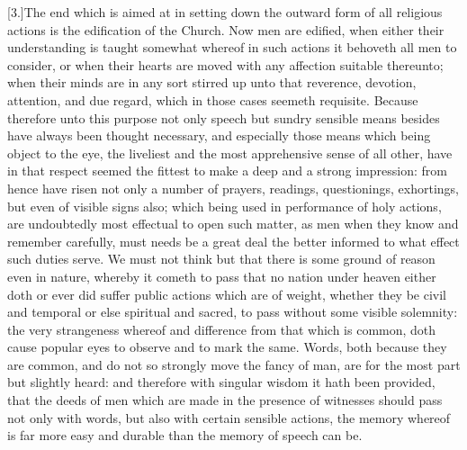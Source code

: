 [3.]The end which is aimed at in setting down the outward form of all religious actions is the edification of the Church. Now men are edified, when either their understanding is taught somewhat whereof in such actions it behoveth all men to consider, or when their hearts are moved with any affection suitable thereunto; when their minds are in any sort stirred up unto that reverence, devotion, attention, and due regard, which in those cases seemeth requisite. Because therefore unto this purpose not only speech but sundry sensible means besides have always been thought necessary, and especially those means which being object to the eye, the liveliest and the most apprehensive sense of all other, have in that respect seemed the fittest to make a deep and a strong impression: from hence have risen not only a number of prayers, readings, questionings, exhortings, but even of visible signs also; which being used in performance of holy actions, are undoubtedly most effectual to open such matter, as men when they know and remember carefully, must needs be a great deal the better informed to what effect such duties serve. We must not think but that there is some ground of reason even in nature, whereby it cometh to pass that no nation under heaven either doth or ever did suffer public actions  which are of weight, whether they be civil and temporal or else spiritual and sacred, to pass without some visible solemnity: the very strangeness whereof and difference from that which is common, doth cause popular eyes to observe and to mark the same. Words, both because they are common, and do not so strongly move the fancy of man, are for the most part but slightly heard: and therefore with singular wisdom it hath been provided, that the deeds of men which are made in the presence of witnesses should pass not only with words, but also with certain sensible actions, the memory whereof is far more easy and durable than the memory of speech can be.

